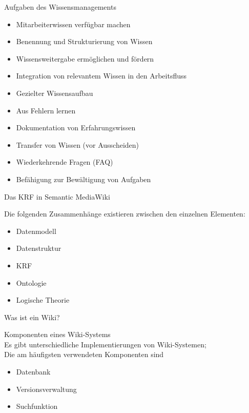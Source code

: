 \documentclass[aspectratio=1610,onlymath]{beamer}
\begin{document}
\begin{frame}{Aufgaben des Wissensmanagements}

\begin{itemize}
	\item Mitarbeiterwissen verfügbar machen
\item Benennung und Strukturierung von Wissen
\item Wissensweitergabe ermöglichen und fördern
\item Integration von relevantem Wissen in den Arbeitsfluss
\item Gezielter Wissensaufbau
\item Aus Fehlern lernen
\item Dokumentation von Erfahrungswissen 
\item Transfer von Wissen (vor Ausscheiden) 
\item Wiederkehrende Fragen (FAQ) 
\item Befähigung zur Bewältigung von Aufgaben
\end{itemize}

\end{frame}



\begin{frame}{Das KRF in Semantic MediaWiki}

Die folgenden Zusammenhänge existieren zwischen den einzelnen Elementen:
\begin{itemize}
	\item Datenmodell
	\item Datenstruktur
	\item KRF
	\item Ontologie
	\item Logische Theorie 
\end{itemize}

\end{frame}



\begin{frame}{Was ist ein Wiki?}
	
	
	\vspace{2em}
	\alert{Komponenten eines Wiki-Systems}\\[1em]
	Es gibt unterschiedliche Implementierungen von Wiki-Systemen; \\
	Die am häufigsten verwendeten Komponenten sind
	\begin{itemize}
		\item Datenbank
		\item Versionsverwaltung
		\item Suchfunktion
	\end{itemize}

\end{frame}
\end{document}
